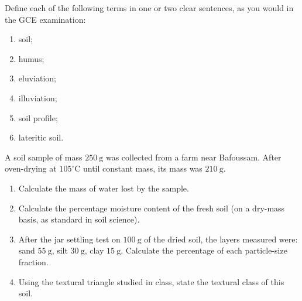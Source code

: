 \documentclass[11pt]{article}
\newcounter{popsec}
\newcounter{popsub}
\newcommand{\courssub}[1]{%
  \stepcounter{popsub}%
  \par\vspace{9pt}\noindent{\popxbold\fontsize{11.5}{13}\selectfont\color{popink}{\color{poporange}\thepopsec.\thepopsub}\hspace{6pt}#1}\par\nopagebreak\vspace{4pt}
}
\begin{document}
\begin{exercice}
Define each of the following terms in one or two clear sentences, as you would in the GCE examination:
\begin{enumerate}
\item soil;
\item humus;
\item eluviation;
\item illuviation;
\item soil profile;
\item lateritic soil.
\end{enumerate}
\end{exercice}

\begin{exercice}
A soil sample of mass $250\ \mathrm{g}$ was collected from a farm near Bafoussam. After oven-drying at $105^\circ\mathrm{C}$ until constant mass, its mass was $210\ \mathrm{g}$.
\begin{enumerate}
\item Calculate the mass of water lost by the sample.
\item Calculate the percentage moisture content of the fresh soil (on a dry-mass basis, as standard in soil science).
\item After the jar settling test on $100\ \mathrm{g}$ of the dried soil, the layers measured were: sand $55\ \mathrm{g}$, silt $30\ \mathrm{g}$, clay $15\ \mathrm{g}$. Calculate the percentage of each particle-size fraction.
\item Using the textural triangle studied in class, state the textural class of this soil.
\end{enumerate}
\end{exercice}

\courssub{I practise}
\end{document}

